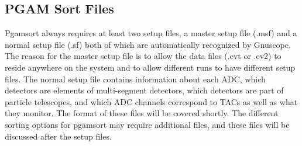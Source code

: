 \subsection{PGAM Sort Files}

Pgamsort always requires at least two setup files, a master setup file (.msf) and a normal setup file (.sf) both of which are automatically recognized by Gnuscope.  The reason for the master setup file is to allow the data files (.evt or .ev2) to reside anywhere on the system and to allow different runs to have different setup files.  The normal setup file contains information about each ADC, which detectors are elements of multi-segment detectors, which detectors are part of particle telescopes, and which ADC channels correspond to TACs as well as what they monitor.  The format of these files will be covered shortly.  The different sorting options for pgamsort may require additional files, and these files will be discussed after the setup files.

